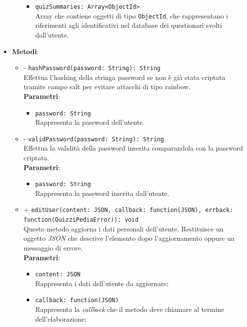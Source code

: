 \begin{itemize}
\begin{itemize}
\begin{itemize}
				\item
					\texttt{quizSummaries: Array<ObjectId>}\\ Array che contiene oggetti di tipo \texttt{ObjectId}, che rappresentano i riferimenti agli identificativi nel database dei questionari svolti dall'utente.		
			\end{itemize}	
		\end{itemize}	
	\item \textbf{Metodi}:
		\begin{itemize}
		\item
		- \texttt{hashPassword(password: String): String} \\
		Effettua l'hashing della stringa password se non è già stata criptata tramite campo salt per evitare attacchi di tipo rainbow. \\
		\textbf{Parametri}: 
			\begin{itemize}
			\item
				 \texttt{password: String} \\
				Rappresenta la password dell'utente.
			\end{itemize}
		\item
		- \texttt{validPassword(password: String): String} \\
		Effettua la validità della password inserita comparandola con la password criptata.	\\
		\textbf{Parametri}: 
			\begin{itemize}
			\item
				\texttt{password: String} \\
				Rappresenta la password inserita dall'utente.
			\end{itemize}
		\item
		+ \texttt{editUser(content: JSON, callback: function(JSON), errback:\\ function(QuizziPediaError)): void} \\
		Questo metodo aggiorna i dati personali dell'utente. Restituisce un oggetto \textit{JSON} che descrive l'elemento dopo l'aggiornamento oppure un messaggio di errore.	\\
		\textbf{Parametri}: 
			\begin{itemize}
			\item
				\texttt{content: JSON} \\
				Rappresenta i dati dell'utente da aggiornare;
			\item	
				\texttt{callback: function(JSON)} \\
				Rappresenta la \textit{callback} che il metodo deve chiamare al termine dell'elaborazione;

\end{itemize}
\end{itemize}
\end{itemize}
